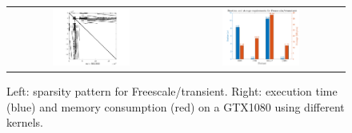 \begin{figure}[t]
\begin{center}
\begin{tabular}{cc}
\includegraphics[width=0.48\textwidth]{plots/pattern.pdf} &
\includegraphics[width=0.48\textwidth]{plots/motivation.pdf}
\end{tabular}
\end{center}
\vspace*{-2ex}
    \caption{Left: sparsity pattern for {\sc Freescale/transient}.
    Right: execution time (blue) and memory consumption (red) on a GTX1080
    using different \spmv kernels.}
\label{fig:motivation}
\end{figure}

